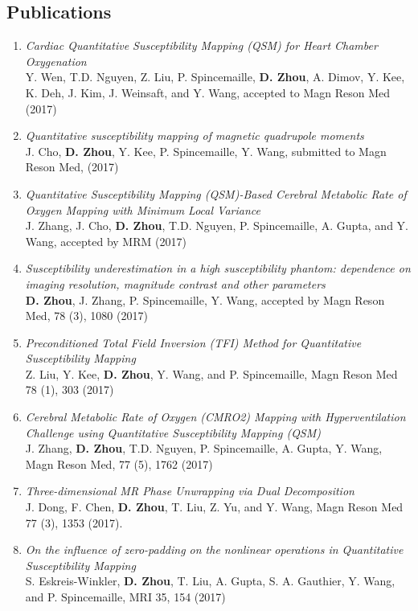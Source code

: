 \documentclass[centered,11pt,overlapped]{res}
\begin{document}
\begin{resume}
{\section{\sc Publications}
\begin{enumerate}[leftmargin=-0.1in]
\item{\em Cardiac Quantitative Susceptibility Mapping (QSM) for Heart Chamber Oxygenation}\\
Y. Wen, T.D. Nguyen, Z. Liu, P. Spincemaille, {\bf D. Zhou}, A. Dimov, Y. Kee, K. Deh, J. Kim, J. Weinsaft, and Y. Wang, accepted to Magn Reson Med (2017)
\item {\em Quantitative susceptibility mapping of magnetic quadrupole moments}\\
J. Cho, {\bf D. Zhou}, Y. Kee, P. Spincemaille, Y. Wang, submitted to Magn Reson Med, (2017)
\item {\em Quantitative Susceptibility Mapping (QSM)-Based Cerebral Metabolic Rate of Oxygen Mapping with Minimum Local Variance }\\
J. Zhang, J. Cho, {\bf D. Zhou}, T.D. Nguyen, P. Spincemaille, A. Gupta, and Y. Wang, accepted by MRM (2017)
\item {\em Susceptibility underestimation in a high susceptibility phantom: dependence on imaging resolution, magnitude contrast and other parameters}\\
{\bf D. Zhou}, J. Zhang, P. Spincemaille, Y. Wang, accepted by Magn Reson Med, 78 (3), 1080 (2017)
\item {\em Preconditioned Total Field Inversion (TFI) Method for Quantitative Susceptibility Mapping} \\
Z. Liu, Y. Kee, {\bf D. Zhou}, Y. Wang, and P. Spincemaille, Magn Reson Med 78 (1), 303 (2017)
\item {\em Cerebral Metabolic Rate of Oxygen (CMRO2) Mapping with Hyperventilation Challenge using Quantitative Susceptibility Mapping (QSM)}\\
J. Zhang, {\bf D. Zhou}, T.D. Nguyen, P. Spincemaille, A. Gupta, Y. Wang, Magn Reson Med, 77 (5), 1762 (2017)
\item {\em Three-dimensional MR Phase Unwrapping via Dual Decomposition} \\
J. Dong, F. Chen,  {\bf D. Zhou}, T. Liu, Z. Yu, and Y. Wang, Magn Reson Med 77 (3), 1353 (2017).
\item {\em On the influence of zero-padding on the nonlinear operations in Quantitative Susceptibility Mapping}\\
S. Eskreis-Winkler, {\bf D. Zhou}, T. Liu, A. Gupta, S. A. Gauthier, Y. Wang, and P. Spincemaille, MRI 35, 154 (2017)

\end{enumerate}}
\end{resume}
\end{document}
